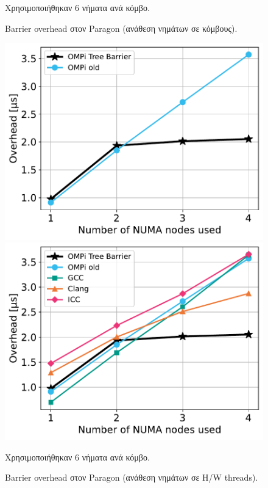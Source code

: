 \begin{figure}[htbp]
\begin{minipage}{0.48\textwidth}
    \end{minipage}
    \newline \newline
    {\small Χρησιμοποιήθηκαν 6 νήματα ανά κόμβο.}
    \caption{Barrier overhead στον Paragon (ανάθεση νημάτων σε κόμβους).}
    \label{fig:bo-paragon-toponodes}
\end{figure}

\begin{figure}[H]
    \centering
    \begin{minipage}{0.48\textwidth}
        \centering
        \includegraphics[width=1\textwidth]{Figures/paragon-epcc/ompionly_topothreads_tpn-6_close.pdf}
    \end{minipage}\hfill
    \begin{minipage}{0.48\textwidth}
        \centering
        \includegraphics[width=1\textwidth]{Figures/paragon-epcc/topothreads_tpn-6_close.pdf}
    \end{minipage}
    \newline \newline
    {\small Χρησιμοποιήθηκαν 6 νήματα ανά κόμβο.}
    \caption{Barrier overhead στον Paragon (ανάθεση νημάτων σε H/W threads).}
    \label{fig:bo-paragon-topothreads}
\end{figure}

